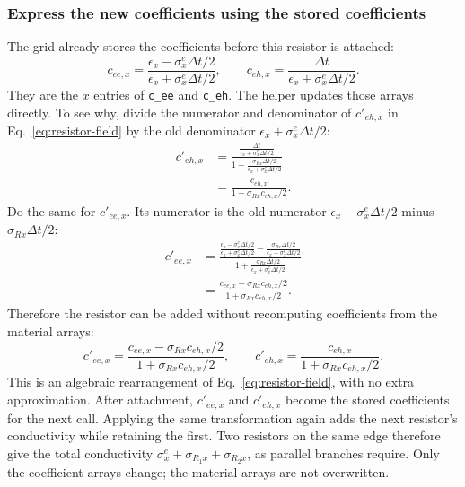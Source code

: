 \documentclass[10pt]{article}
\begin{document}
\subsubsection{Express the new coefficients using the stored coefficients}
The grid already stores the coefficients before this resistor is attached:
\begin{equation}
    c_{ee,x}=\frac{\epsilon_x-\sigma_x^e\Delta t/2}
                       {\epsilon_x+\sigma_x^e\Delta t/2},\qquad
    c_{eh,x}=\frac{\Delta t}{\epsilon_x+\sigma_x^e\Delta t/2}.
    \label{eq:resistor-old-coefficients}
\end{equation}
They are the $x$ entries of \texttt{c\_ee} and \texttt{c\_eh}.
The helper updates those arrays directly. To see why, divide the numerator
and denominator of $c'_{eh,x}$ in Eq.~\eqref{eq:resistor-field} by the old
denominator $\epsilon_x+\sigma_x^e\Delta t/2$:
\begin{equation}
    \begin{aligned}
    c'_{eh,x}
    &=\frac{\displaystyle
            \frac{\Delta t}{\epsilon_x+\sigma_x^e\Delta t/2}}
           {\displaystyle 1+
            \frac{\sigma_{Rx}\Delta t/2}{\epsilon_x+\sigma_x^e\Delta t/2}}\\[3pt]
    &=\frac{c_{eh,x}}{1+\sigma_{Rx}c_{eh,x}/2}.
    \end{aligned}
\end{equation}
Do the same for $c'_{ee,x}$. Its numerator is the old numerator
$\epsilon_x-\sigma_x^e\Delta t/2$ minus $\sigma_{Rx}\Delta t/2$:
\begin{equation}
    \begin{aligned}
    c'_{ee,x}
    &=\frac{\displaystyle
            \frac{\epsilon_x-\sigma_x^e\Delta t/2}
                 {\epsilon_x+\sigma_x^e\Delta t/2}
            -\frac{\sigma_{Rx}\Delta t/2}
                  {\epsilon_x+\sigma_x^e\Delta t/2}}
           {\displaystyle 1+
            \frac{\sigma_{Rx}\Delta t/2}{\epsilon_x+\sigma_x^e\Delta t/2}}\\[3pt]
    &=\frac{c_{ee,x}-\sigma_{Rx}c_{eh,x}/2}
            {1+\sigma_{Rx}c_{eh,x}/2}.
    \end{aligned}
\end{equation}
Therefore the resistor can be added without recomputing coefficients from
the material arrays:
\begin{equation}
    \boxed{c'_{ee,x}=
        \frac{c_{ee,x}-\sigma_{Rx}c_{eh,x}/2}
             {1+\sigma_{Rx}c_{eh,x}/2},\qquad
        c'_{eh,x}=\frac{c_{eh,x}}{1+\sigma_{Rx}c_{eh,x}/2}.}
    \label{eq:resistor-coefficient-transform}
\end{equation}
This is an algebraic rearrangement of Eq.~\eqref{eq:resistor-field}, with
no extra approximation. After attachment, $c'_{ee,x}$ and $c'_{eh,x}$ become
the stored coefficients for the next call. Applying the same transformation
again adds the next resistor's conductivity while retaining the first.
Two resistors on the same edge therefore give the total conductivity
$\sigma_x^e+\sigma_{R_1x}+\sigma_{R_2x}$, as parallel branches require.
Only the coefficient arrays change; the material arrays are not overwritten.
\end{document}
